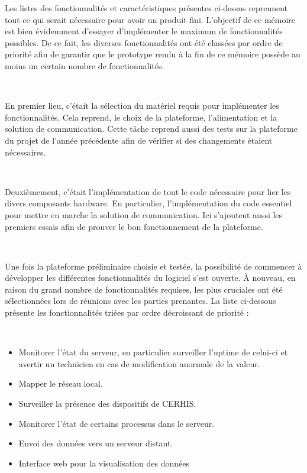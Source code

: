 \noindent
Les listes des fonctionnalités et caractéristiques présentes ci-dessus reprennent tout ce qui serait nécessaire pour avoir un produit fini. L'objectif de ce mémoire est bien évidemment d'essayer d'implémenter le maximum de fonctionnalités possibles. De ce fait, les diverses fonctionnalités ont été classées par ordre de priorité afin de garantir que le prototype rendu à la fin de ce mémoire possède au moins un certain nombre de fonctionnalités.

~

\noindent
En premier lieu, c'était la sélection du matériel requis pour implémenter les fonctionnalités. Cela reprend, le choix de la plateforme, l'alimentation et la solution de communication. Cette tâche reprend aussi des tests sur la plateforme du projet de l'année précédente afin de vérifier si des changements étaient nécessaires.

~

\noindent
Deuxièmement, c'était l'implémentation de tout le code nécessaire pour lier les divers composants hardware. En particulier, l'implémentation du code essentiel pour mettre en marche la solution de communication. Ici s'ajoutent aussi les premiers essais afin de prouver le bon fonctionnement de la plateforme.

~

\noindent
Une fois la plateforme préliminaire choisie et testée, la possibilité de commencer à développer les différentes fonctionnalités du logiciel s'est ouverte. À nouveau, en raison du grand nombre de fonctionnalités requises, les plus cruciales ont été sélectionnées lors de réunions avec les parties prenantes. La liste ci-dessous présente les fonctionnalités triées par ordre décroissant de priorité :

~


\begin{itemize}
  \item Monitorer l'état du serveur, en particulier surveiller l'uptime de celui-ci et avertir un technicien en cas de modification anormale de la valeur.
  \item Mapper le réseau local.
  \item Surveiller la présence des dispositifs de CERHIS.
  \item Monitorer l'état de certains processus dans le serveur.
  \item Envoi des données vers un serveur distant.
  \item Interface web pour la visualisation des données
\end{itemize}

